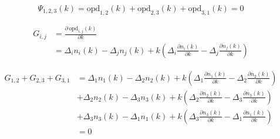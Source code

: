 \documentclass[a4paper,11pt,twoside]{scrartcl}
\newcommand{\opd}{\textrm{opd}}
\begin{document}
\begin{equation}
	\Psi_{1,2,3}(k) = \opd_{1,2}(k) + \opd_{2,3}(k) +\opd_{3,1}(k) = 0
\end{equation}

\begin{align}
	G_{i,j} &= \frac{\partial\, \opd_{i,j}(k)}{\partial k}\\
	&= \Delta_i n_i(k) - \Delta_j n_j(k) + k \left(\Delta_i \frac{\partial n_i(k)}{\partial k} - \Delta_j \frac{\partial n_j(k)}{\partial k}\right)
\end{align}

\begin{align}
	G_{1,2} + G_{2,3} + G_{3,1} &=  \Delta_1 n_1(k) - \Delta_2 n_2(k) + k \left(\Delta_1 \frac{\partial n_1(k)}{\partial k} - \Delta_2 \frac{\partial n_2(k)}{\partial k}\right)\nonumber\\
	&+ \Delta_2 n_2(k) - \Delta_3 n_3(k) + k \left(\Delta_2 \frac{\partial n_2(k)}{\partial k} - \Delta_3 \frac{\partial n_3(k)}{\partial k}\right)\nonumber\\
	&+ \Delta_3 n_3(k) - \Delta_1 n_1(k) + k \left(\Delta_3 \frac{\partial n_3(k)}{\partial k} - \Delta_1 \frac{\partial n_1(k)}{\partial k}\right)\\
	&= 0
\end{align}
\end{document}
